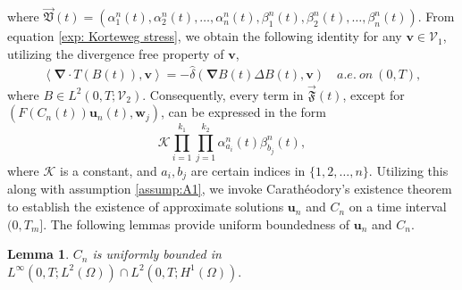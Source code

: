 \documentclass[final,3p,times]{elsarticle}
\newtheorem{lemma}{Lemma}
\theoremstyle{plain}
\theoremstyle{remark}
\theoremstyle{plain}
\theoremstyle{remark}
\begin{document}
where $\vec{\mathfrak{V}}(t)=(\alpha_1^n(t),\alpha_2^n(t),\dots,\alpha_n^n(t),\beta_1^n(t),\beta_2^n(t),\dots,\beta_n^n(t))$. From equation \eqref{exp: Korteweg stress}, we obtain the following identity for any \( \mathbf v \in \mathscr V_1 \), utilizing the divergence free property of $\mathbf v$,
\begin{align}  
    \left\langle \boldsymbol{\nabla} \cdot T(B(t)), \mathbf{v} \right\rangle = -\hat{\delta} \left( \boldsymbol{\nabla} B(t) \Delta B(t), \mathbf{v} \right)  \quad a.e.\ on \ (0,T)
    \label{eq: Korteweg expression},
\end{align}  
where $B\in L^2(0,T;\mathscr V_2).$
Consequently, every term in \( \vec{\mathfrak{F}}(t) \), except for \( \left( F(C_n(t)) \mathbf{u}_n(t), \mathbf{w}_j \right) \), can be expressed in the form  
\[
\mathscr{K}\prod_{i=1}^{k_1} \prod_{j=1}^{k_2} \alpha_{a_i}^n(t) \beta_{b_j}^n(t),
\]  
where $\mathscr{K}$ is a constant, and \( a_i, b_j \) are certain indices in \( \{1,2,\dots,n\} \).
Utilizing this along with assumption \eqref{assump:A1}, we invoke Carathéodory’s existence theorem to establish the existence of approximate solutions $\mathbf u_n$ and $C_n$ on a time interval $(0,T_m]$. The following lemmas provide uniform boundedness of $\mathbf u_n$ and $C_n$. 
\begin{lemma}\label{lemma:L1}
$C_n$ is uniformly bounded in $L^\infty\left(0,T;L^2\left(\Omega\right)\right)\cap L^2\left(0,T;H^1(\Omega)\right).$
\end{lemma}
\end{document}
